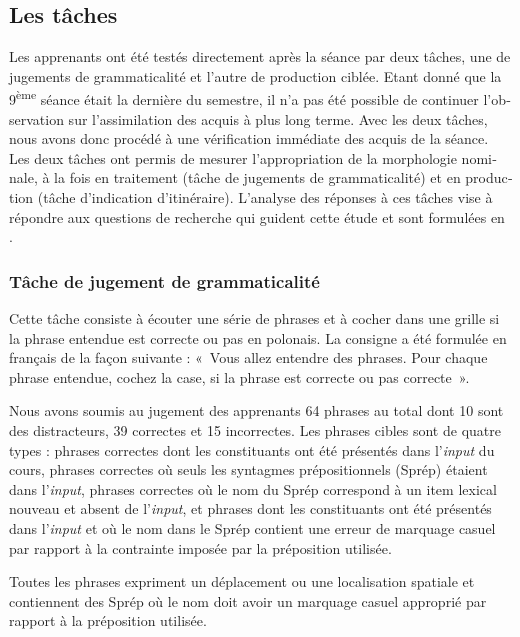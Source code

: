 \documentclass[output=paper]{langscibook}
\begin{document}
\begin{otherlanguage}{french}
\subsection{Les tâches}\label{sec:watorek:4.4}

Les apprenants ont été testés directement après la séance par deux tâches, une de jugements de grammaticalité et l’autre de production ciblée. Etant donné que la 9\textsuperscript{ème} séance était la dernière du semestre, il n’a pas été possible de continuer l’observation sur l’assimilation des acquis à plus long terme. Avec les deux tâches, nous avons donc procédé à une vérification immédiate des acquis de la séance. Les deux tâches ont permis de mesurer l’appropriation de la morphologie nominale, à la fois en traitement (tâche de jugements de grammaticalité) et en production (tâche d’indication d’itinéraire). L’analyse des réponses à ces tâches vise à répondre aux questions de recherche qui guident cette étude et sont formulées en .


\subsubsection{Tâche de jugement de grammaticalité}\label{sec:watorek:4.4.1}

Cette tâche consiste à écouter une série de phrases et à cocher dans une grille si la phrase entendue est correcte ou pas en polonais. La consigne a été formulée en français de la façon suivante : «~Vous allez entendre des phrases. Pour chaque phrase entendue, cochez la case, si la phrase est correcte ou pas correcte~».

Nous avons soumis au jugement des apprenants 64 phrases au total dont 10 sont des distracteurs, 39 correctes et 15 incorrectes. Les phrases cibles sont de quatre types :  phrases correctes dont les constituants ont été présentés dans l’\textit{input} du cours,  phrases correctes où seuls les syntagmes prépositionnels (Sprép) étaient dans l’\textit{input},  phrases correctes où le nom du Sprép correspond à un item lexical nouveau et absent de l’\textit{input}, et  phrases dont les constituants ont été présentés dans l’\textit{input} et où le nom dans le Sprép contient une erreur de marquage casuel par rapport à la contrainte imposée par la préposition utilisée.

Toutes les phrases expriment un déplacement ou une localisation spatiale et contiennent des Sprép où le nom doit avoir un marquage casuel approprié par rapport à la préposition utilisée.


\end{otherlanguage}
\end{document}
